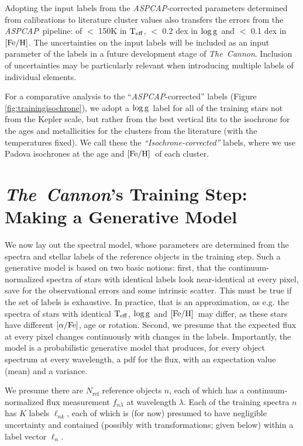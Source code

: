 \documentclass[12pt, preprint]{aastex}
\newcommand{\tc}{\textsl{The~Cannon}}
\newcommand{\aspcap}{\textsl{ASPCAP}}
\newcommand{\set}[1]{\bm{#1}}
\newcommand{\starlabel}{\ell}
\newcommand{\starlabelvec}{\set{\starlabel}}
\newcommand{\teff}{\mbox{$\rm T_{eff}$}}
\newcommand{\feh}{\mbox{$\rm [Fe/H]$}}
\newcommand{\alphafe}{\mbox{$\rm [\alpha/Fe]$}}
\newcommand{\logg}{\mbox{$\rm \log g$}}
\newcommand{\rfn}{\mathrm{ref}}
\begin{document}
Adopting the input labels from the \aspcap-corrected parameters determined from calibrations to literature cluster values also transfers the errors from the \aspcap\ pipeline: of $<$ 150K in \teff,  $<$ 0.2 dex in \logg\ and $<$ 0.1 dex in \feh.   
The uncertainties on the input labels will be included as an input parameter of the labels in a future development stage of \tc. Inclusion of uncertainties may be particularly relevant when introducing multiple labels of individual elements. 

For a comparative analysis to the ``\aspcap-corrected'' labels (Figure \ref{fig:trainingisochrone}), we adopt a \logg\ label for all of the training stars not from the Kepler scale, but rather from the best vertical fits to the isochrone for the ages and metallicities for the clusters from the literature (with the temperatures fixed).
We call these the \textit{``Isochrone-corrected''} labels, where we use Padova isochrones at the age and \feh\ of each cluster. 

\section{\tc 's Training Step: Making a Generative Model}
\label{sec:spectralmodel}

We now lay out the spectral model, whose parameters are determined 
from the spectra and stellar labels of the reference objects in the training step.
Such a generative model is based on two basic notions: first, that the continuum-normalized spectra of
stars with identical labels look near-identical at every pixel, save for the observational errors
and some intrinsic scatter. This must be true if the set of labels is exhaustive. 
In practice, that is an approximation, as e.g. the spectra of stars with identical \teff , \logg \ and \feh\ may differ, 
as these stars have different \alphafe , age or rotation. Second, we presume that the expected flux at every pixel changes continuously
with changes in the labels.
Importantly, the model is a probabilistic generative model that produces,
for every object spectrum at every wavelength,
a pdf for the flux, with an expectation value (mean) and a variance.

We presume there are $N_\rfn$ reference objects $n$, each of which has
a continuum-normalized flux measurement $f_{n\lambda}$ at wavelength
$\lambda$. Each of the training spectra $n$ has $K$ labels $\starlabel_{nk}$, each of which
is (for now) presumed to have negligible uncertainty and contained (possibly with transformations; given below)
within a label vector $\starlabelvec_n$.
\end{document}
